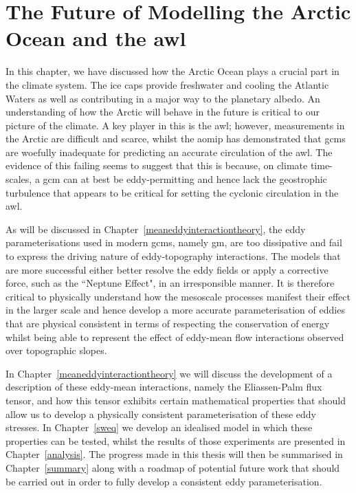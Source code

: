 \documentclass[12pt,a4paper]{report}
\begin{document}
\section{The Future of Modelling the Arctic Ocean and the \gls{awl}}

In this chapter, we have discussed how the Arctic Ocean plays a crucial part in the
climate system. The ice caps provide freshwater and cooling the Atlantic Waters as 
well as contributing in a major way to the planetary albedo. An understanding of how
the Arctic will behave in the future is critical to our picture of the climate.
A key player in this is the \gls{awl}; however, measurements in the Arctic are
difficult and scarce, whilst the \gls{aomip} has demonstrated that \glspl{gcm} are woefully inadequate for predicting an accurate circulation of the \gls{awl}. 
The evidence of this failing seems to suggest that this is because, on 
climate time-scales, a \gls{gcm} can at best be eddy-permitting and hence
lack the geostrophic turbulence that appears to be critical for setting the 
cyclonic circulation in the \gls{awl}. 

As will be discussed in Chapter~\ref{meaneddyinteractiontheory},
the eddy parameterisations used in modern \glspl{gcm}, namely \gls{gm}, are too 
dissipative and fail to express the driving nature of eddy-topography interactions. 
The models that are more successful either better resolve the eddy fields or apply 
a corrective force, such as the ``Neptune Effect", in an irresponsible manner. 
It is therefore critical to physically understand how the mesoscale processes
manifest their effect in the larger scale and hence develop a more accurate
parameterisation of eddies that are physical consistent in terms of respecting
the conservation of energy whilst being able to represent the effect of eddy-mean flow
 interactions observed over topographic slopes.
 
 In Chapter~\ref{meaneddyinteractiontheory} we will discuss the development
 of a description of these eddy-mean interactions, namely the Eliassen-Palm
 flux tensor, and how this tensor exhibits certain mathematical properties that
 should allow us to develop a physically consistent parameterisation of these 
 eddy stresses. In Chapter~\ref{sweq} we develop an idealised model in which these
 properties can be tested, whilst the results of those experiments are presented in 
 Chapter~\ref{analysis}. The progress made in this thesis will then be summarised
 in Chapter~\ref{summary} along with a roadmap of potential future work that 
 should be carried out in order to fully develop a consistent eddy parameterisation.
\end{document}
